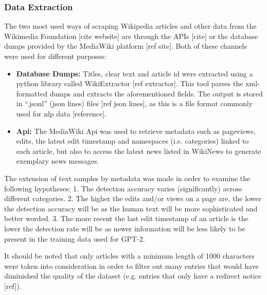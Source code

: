 \subsubsection{Data Extraction}
\label{sub:data_extraction}

The two most used ways of scraping Wikipedia articles and other data from the Wikimedia Foundation 
[cite website] are through the APIs [cite] or the database dumps provided by the MediaWiki platform [ref site]. 
Both of these channels were used for different purposes:

\begin{itemize}
    \item{\textbf{Database Dumps:}} Titles, clear text and article id were extracted using a python library called WikiExtractor [ref extractor]. 
    This tool parses the xml-formatted dumps and extracts the aforementioned fields. The output is stored in “.jsonl” (json lines) 
    files [ref json lines], as this is a file format commonly used for nlp data [reference].
    \item{\textbf{Api:}} The MediaWiki Api was used to retrieve metadata such as pageviews, edits, the latest edit timestamp and namespaces (i.e. categories) linked to each article, but also to access the latest news listed in WikiNews to generate exemplary news messages.
\end{itemize}

The extension of text samples by metadata was made in order to examine the following hypotheses:
1. The detection accuracy varies (significantly) across different categories.
2. The higher the edits and/or views on a page are, the lower the detection accuracy will be as the human text will be more sophisticated and better worded.
3. The more recent the last edit timestamp of an article is the lower the detection rate will be as newer information will be less likely to be present in the training data used for GPT-2.

It should be noted that only articles with a minimum length of 1000 characters were taken into consideration in order to filter out many entries that would have diminished the quality of the dataset (e.g. entries that only have a redirect notice [ref]).
